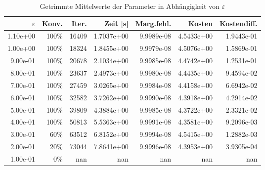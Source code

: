 \begin{table}[htbp]
\caption{Getrimmte Mittelwerte der Parameter in Abhängigkeit von $\varepsilon$}
\label{tab:Parametertest512_1}
\small
\centering
{}
\begin{tabular}{rrrrrrr}
\toprule
$\varepsilon$ & Konv. & Iter. & Zeit [s] & Marg.fehl. & Kosten & Kostendiff. \\
\midrule
1.10e+00 & 100\% & 16409 & 1.7037e+00 & 9.9989e-08 & 4.5433e+00 & 1.9443e-01 \\
1.00e+00 & 100\% & 18324 & 1.8455e+00 & 9.9979e-08 & 4.5076e+00 & 1.5869e-01 \\
9.00e-01 & 100\% & 20678 & 2.1034e+00 & 9.9985e-08 & 4.4742e+00 & 1.2531e-01 \\
8.00e-01 & 100\% & 23637 & 2.4973e+00 & 9.9980e-08 & 4.4435e+00 & 9.4594e-02 \\
7.00e-01 & 100\% & 27459 & 3.0265e+00 & 9.9984e-08 & 4.4158e+00 & 6.6942e-02 \\
6.00e-01 & 100\% & 32582 & 3.7262e+00 & 9.9990e-08 & 4.3918e+00 & 4.2914e-02 \\
5.00e-01 & 100\% & 39809 & 4.3884e+00 & 9.9985e-08 & 4.3722e+00 & 2.3321e-02 \\
4.00e-01 & 100\% & 50813 & 5.5363e+00 & 9.9991e-08 & 4.3581e+00 & 9.2096e-03 \\
3.00e-01 & 60\% & 63512 & 6.8152e+00 & 9.9994e-08 & 4.5415e+00 & 1.2882e-03 \\
2.00e-01 & 20\% & 73044 & 7.8641e+00 & 9.9996e-08 & 4.3953e+00 & 3.9305e-04 \\
1.00e-01 & 0\% & nan & nan & nan & nan & nan \\
\bottomrule
\end{tabular}
\end{table}
